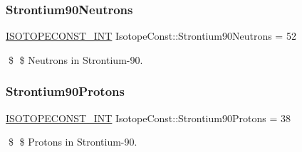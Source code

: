 \subsubsection{\texorpdfstring{Strontium90\+Neutrons}{Strontium90Neutrons}}
{\footnotesize\ttfamily \mbox{\hyperlink{group___isotope_const-_macros_ga5f18360b3e99483a35c32d789e62621c}{I\+S\+O\+T\+O\+P\+E\+C\+O\+N\+S\+T\+\_\+\+I\+NT}} Isotope\+Const\+::\+Strontium90\+Neutrons = 52}

\$ \$ Neutrons in Strontium-\/90. \mbox{\label{group___isotope_const-_strontium-_sr90_ga8b21b7fa136fd25d31f402452fcb9c34}} 
\subsubsection{\texorpdfstring{Strontium90\+Protons}{Strontium90Protons}}
{\footnotesize\ttfamily \mbox{\hyperlink{group___isotope_const-_macros_ga5f18360b3e99483a35c32d789e62621c}{I\+S\+O\+T\+O\+P\+E\+C\+O\+N\+S\+T\+\_\+\+I\+NT}} Isotope\+Const\+::\+Strontium90\+Protons = 38}

\$ \$ Protons in Strontium-\/90. 